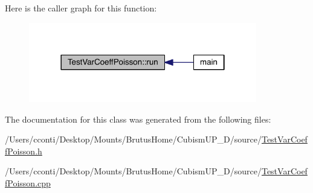 Here is the caller graph for this function\+:\nopagebreak
\begin{figure}[H]
\begin{center}
\leavevmode
\includegraphics[width=282pt]{d7/d0a/class_test_var_coeff_poisson_add52c16d25492f911193e23bb6ee6b2e_icgraph}
\end{center}
\end{figure}




The documentation for this class was generated from the following files\+:\begin{DoxyCompactItemize}
\item 
/\+Users/cconti/\+Desktop/\+Mounts/\+Brutus\+Home/\+Cubism\+U\+P\+\_\+D/source/\hyperlink{_test_var_coeff_poisson_8h}{Test\+Var\+Coeff\+Poisson.\+h}\item 
/\+Users/cconti/\+Desktop/\+Mounts/\+Brutus\+Home/\+Cubism\+U\+P\+\_\+D/source/\hyperlink{_test_var_coeff_poisson_8cpp}{Test\+Var\+Coeff\+Poisson.\+cpp}\end{DoxyCompactItemize}
